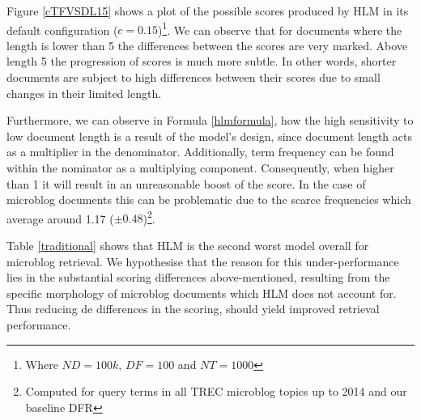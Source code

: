Figure \ref{cTFVSDL15} shows a plot of the possible scores produced by HLM in its default configuration (\(c=0.15\))\footnote{Where \(ND=100k\), \(DF=100\) and \(NT=1000\)}. We can observe that for documents where the length is lower than 5 the differences between the scores are very marked. Above length 5 the progression of scores is much more subtle. In other words, shorter documents are subject to high differences between their scores due to small changes in their limited length.

Furthermore, we can observe in Formula \ref{hlmformula}, how the high sensitivity to low document length is a result of the model's design, since document length acts as a multiplier in the denominator. Additionally, term frequency can be found within the nominator as a multiplying component. Consequently, when higher than 1 it will result in an unreasonable boost of the score. In the case of microblog documents this can be problematic due to the scarce frequencies which average around 1.17 ($\pm 0.48$)\footnote{Computed for query terms in all TREC microblog topics up to 2014 and our baseline DFR}.


 
%
%   
%

Table \ref{traditional} shows that HLM is the second worst model overall for microblog retrieval. We hypothesise that the reason for this under-performance lies in the substantial scoring differences above-mentioned, resulting from the specific morphology of microblog documents which HLM does not account for. Thus reducing de differences in the scoring, should yield improved retrieval performance.

